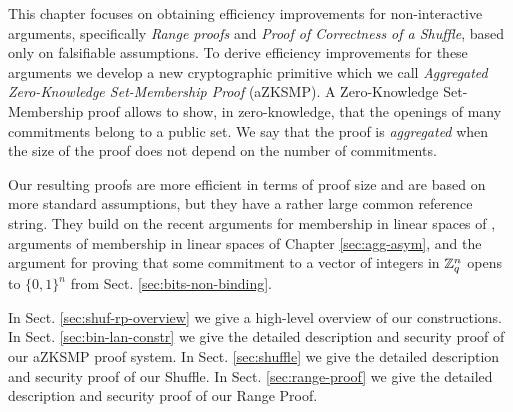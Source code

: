 This chapter focuses on obtaining efficiency improvements for non-interactive arguments, specifically \emph{Range proofs} and \emph{Proof of Correctness of a Shuffle}, based only on falsifiable assumptions.  To derive efficiency improvements for these arguments we develop a new cryptographic primitive which we call \emph{Aggregated Zero-Knowledge Set-Membership Proof} (aZKSMP). A Zero-Knowledge Set-Membership proof allows to show, in zero-knowledge, that the openings of many commitments belong to a public set. We say that the proof is \emph{aggregated} when the size of the proof does not depend on the number of commitments.

Our resulting proofs are more efficient in terms of proof size and are based on more standard assumptions, but they have a rather large common reference string. They build on the recent arguments for membership in linear spaces of \cite{EC:LPJY14,C:JutRoy14,EC:KilWee15}, arguments of membership in linear spaces of Chapter \ref{sec:agg-asym}, and the argument for proving that some commitment to a vector of integers in $\mathbb{Z}_q^{n}$ opens to $\{0,1\}^n$ from Sect. \ref{sec:bits-non-binding}.

In Sect. \ref{sec:shuf-rp-overview} we give a high-level overview of our constructions. In Sect. \ref{sec:bin-lan-constr} we give the detailed description and security proof of our aZKSMP proof system.  In Sect. \ref{sec:shuffle} we give the detailed description and security proof of our Shuffle. In Sect. \ref{sec:range-proof} we give the detailed description and security proof of our Range Proof.
 
